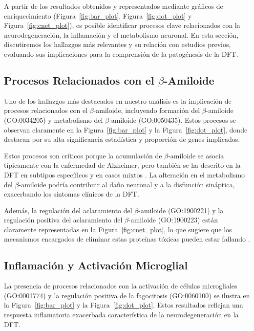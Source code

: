 A partir de los resultados obtenidos y representados mediante gráficos de enriquecimiento (Figura~\ref{fig:bar_plot}, Figura~\ref{fig:dot_plot} y Figura~\ref{fig:cnet_plot}), es posible identificar procesos clave relacionados con la neurodegeneración, la inflamación y el metabolismo neuronal. En esta sección, discutiremos los hallazgos más relevantes y su relación con estudios previos, evaluando sus implicaciones para la comprensión de la patogénesis de la DFT.

\subsection{Procesos Relacionados con el \(\beta\)-Amiloide}

Uno de los hallazgos más destacados en nuestro análisis es la implicación de procesos relacionados con el \(\beta\)-amiloide, incluyendo formación del \(\beta\)-amiloide (GO:0034205) y metabolismo del \(\beta\)-amiloide (GO:0050435). Estos procesos se observan claramente en la Figura~\ref{fig:bar_plot} y la Figura~\ref{fig:dot_plot}, donde destacan por su alta significancia estadística y proporción de genes implicados.

Estos procesos son críticos porque la acumulación de \(\beta\)-amiloide se asocia típicamente con la enfermedad de Alzheimer, pero también se ha descrito en la DFT en subtipos específicos y en casos mixtos \cite{hardy2002amyloid}. La alteración en el metabolismo del \(\beta\)-amiloide podría contribuir al daño neuronal y a la disfunción sináptica, exacerbando los síntomas clínicos de la DFT.

Además, la regulación del aclaramiento del \(\beta\)-amiloide (GO:1900221) y la regulación positiva del aclaramiento del \(\beta\)-amiloide (GO:1900223) están claramente representadas en la Figura~\ref{fig:cnet_plot}, lo que sugiere que los mecanismos encargados de eliminar estas proteínas tóxicas pueden estar fallando \cite{heneka2015neuroinflammation}.


\subsection{Inflamación y Activación Microglial}

La presencia de procesos relacionados con la activación de células microgliales (GO:0001774) y la regulación positiva de la fagocitosis (GO:0060100) se ilustra en la Figura~\ref{fig:bar_plot} y la Figura~\ref{fig:dot_plot}. Estos resultados reflejan una respuesta inflamatoria exacerbada característica de la neurodegeneración en la DFT.

